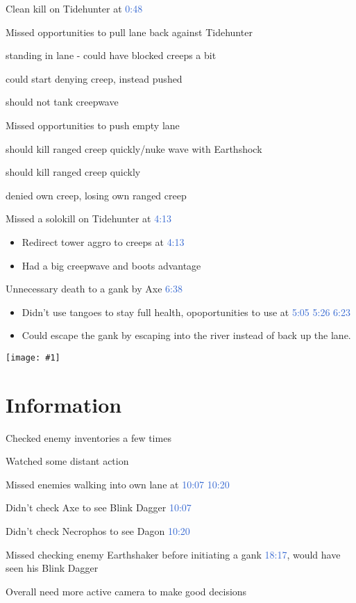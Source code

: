 \documentclass{article}
\newcommand{\gt}{\ensuremath{\;\;\color{green} \filledmedtriangleup} }
\newcommand{\rt}{\ensuremath{\;\;\color{red} \filledmedtriangledown} }
\newcommand{\ws}{\ensuremath{\;\;\color{white} \filledmedsquare} }
\newenvironment{remarks}
    {
        \begin{description}
            \setlength\itemsep{0em}
    }
    {
        \end{description}
    }
\newcommand{\goodremark}[1]{\item[\gt] #1}
\newcommand{\neutralremark}[1]{\item[\ws] #1}
\newcommand{\badremark}[1]{\item[\rt] #1}
\newcommand{\logremark}[2]{\item[\textnormal{\logref{#1}}] #2}
\newcommand{\logref}[1]{\textcolor{highlight}{#1}}
\newcommand{\minimap}[1]{
    \begin{center}
    \begin{minipage}[t]{0.3\textwidth}
        \texttt{[image: \#1]}
    \end{minipage}
\end{center}
}
\begin{document}
    
\begin{remarks}
\goodremark{Clean kill on Tidehunter at \logref{0:48}}

\neutralremark{Missed opportunities to pull lane back against Tidehunter 
\begin{remarks}
    \logremark{1:54}{standing in lane  - could have blocked creeps a bit}
    \logremark{2:19}{could start denying creep, instead pushed}
    \logremark{6:31}{should not tank creepwave}
    \end{remarks} }

\neutralremark{Missed opportunities to push empty lane 
\begin{remarks}
    \logremark{7:59}{ should kill ranged creep quickly/nuke wave with Earthshock}
    \logremark{9:39}{ should kill ranged creep quickly}
    \logremark{9:58}{ denied own creep, losing own ranged creep}
      \end{remarks} }

\badremark{Missed a solokill on Tidehunter at \logref{4:13}
\begin{itemize}
    \item Redirect tower aggro to creeps at \logref{4:13}
    \item Had a big creepwave and boots advantage
\end{itemize}
}


\badremark{Unnecessary death to a gank by Axe \logref{6:38}
\begin{itemize}
    \item Didn't use tangoes to stay full health, opoportunities to use at \logref{5:05} \logref{5:26} \logref{6:23}
    \item Could escape the gank by escaping into the river instead of back up the lane.
\end{itemize}
\minimap{img/638.pdf}
    }
\end{remarks}

\section{Information}
\begin{remarks}
\goodremark{Checked enemy inventories a few times}
\goodremark{Watched some distant action}

\badremark{Missed enemies walking into own lane at \logref{10:07} \logref{10:20}
\begin{remarks}
    \badremark{Didn't check Axe to see Blink Dagger \logref{10:07}}
    \badremark{Didn't check Necrophos to see Dagon \logref{10:20}}
\end{remarks}}

\badremark{Missed checking enemy Earthshaker before initiating a gank \logref{18:17}, would have seen his Blink Dagger}

\badremark{Overall need more active camera to make good decisions}
\end{remarks}
\end{document}
